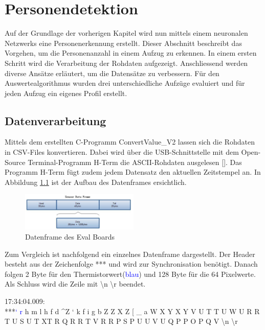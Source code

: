 \chapter{Personendetektion}
\label{chap:Personendetektion}

Auf der Grundlage der vorherigen Kapitel wird nun mittels einem neuronalen Netzwerks eine Personenerkennung erstellt. Dieser Abschnitt beschreibt das Vorgehen, um die Personenanzahl in einem Aufzug zu erkennen. In einem ersten Schritt wird die Verarbeitung der Rohdaten aufgezeigt. Anschliessend werden diverse Ansätze erläutert, um die Datensätze zu verbessern. Für den Auswertealgorithmus wurden drei unterschiedliche Aufzüge evaluiert und für jeden Aufzug ein eigenes Profil erstellt. 

\section{Datenverarbeitung}
\label{Datenverarbeitung}

Mittels dem erstellten C-Programm ConvertValue\_V2 lassen sich die Rohdaten in \ac{CSV}-Files konvertieren. Dabei wird über die USB-Schnittstelle mit dem Open-Source Terminal-Programm H-Term die \ac{ASCII}-Rohdaten ausgelesen [\protect\cite{HTERM}].
Das Programm H-Term fügt zudem jedem Datensatz den aktuellen Zeitstempel an. In Abbildung \ref{fig:Dataframe} ist der Aufbau des Datenframes ersichtlich.

\begin{figure}[H]
	\centering
	\includegraphics[width=0.5\textwidth]
	{fig/Dataframe}
	\caption[Datenframe des Eval Boards]{Datenframe des Eval Boards}
	\label{fig:Dataframe}
\end{figure}

Zum Vergleich ist nachfolgend ein einzelnes Datenframe dargestellt. Der Header besteht aus der Zeichenfolge *** und wird zur Synchronisation benötigt. Danach folgen 2 Byte für den Thermistorwert(\textcolor{blue}{blau}) und 128 Byte für die 64 Pixelwerte. Als Schluss wird die Zeile mit \textbackslash n \textbackslash r beendet.

17:34:04.009: \\
***\textcolor{blue}{‘ r} h m l h f d \^ \space \space Z ` k f i g b Z Z X Z [ \_ a W X Y X Y V U T T U W U R R T U S U T XT R Q R R T V R R P S P U U V U Q P P O P Q V  \textbackslash n \textbackslash r \\

